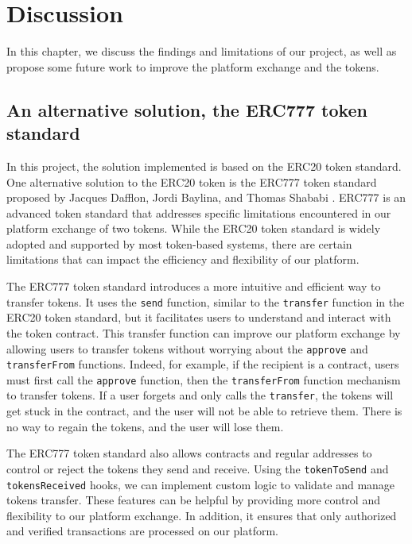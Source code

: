 \chapter{Discussion}
\label{ch:futurework}


In this chapter, we discuss the findings and limitations of our project, as well as propose some future work to improve
the platform exchange and the tokens.


\section{An alternative solution, the ERC777 token standard}


In this project, the solution implemented is based on the ERC20 token standard. One alternative solution to the ERC20 token
is the ERC777 token standard proposed by Jacques Dafflon, Jordi Baylina, and Thomas Shababi \cite{erc777}. ERC777 is an advanced
token standard that addresses specific limitations encountered in our platform exchange of two tokens. While the ERC20
token standard is widely adopted and supported by most token-based systems, there are certain limitations that can
impact the efficiency and flexibility of our platform.


The ERC777 token standard introduces a more intuitive and efficient way to transfer tokens. It uses the
\texttt{send} function, similar to the \texttt{transfer} function in the ERC20 token standard, but it facilitates
users to understand and interact with the token contract. This transfer function can improve our platform exchange by
allowing users to transfer tokens without worrying about the \texttt{approve} and \texttt{transferFrom} functions.
Indeed, for example, if the recipient is a contract, users must first call the \texttt{approve} function, then the
\texttt{transferFrom} function mechanism to transfer tokens. If a user forgets and only calls the \texttt{transfer}, the
tokens will get stuck in the contract, and the user will not be able to retrieve them. There is no way to regain the tokens, and the user will lose them.


The ERC777 token standard also allows contracts and regular addresses to control or reject the tokens they
send and receive. Using the \texttt{tokenToSend} and \texttt{tokensReceived} hooks, we can implement custom logic
to validate and manage tokens transfer. These features can be helpful by providing more control and flexibility
to our platform exchange. In addition, it ensures that only authorized and verified transactions are processed on our platform.


